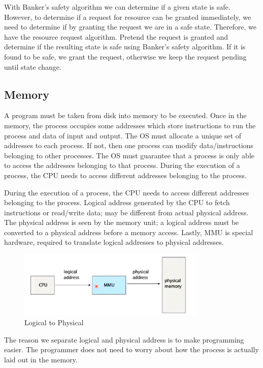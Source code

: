 \documentclass[a4paper]{article}
\theoremstyle{plain}
\theoremstyle{definition}
\newtheorem{defn}{Definition}[section]
\theoremstyle{remark}
\begin{document}
\begin{tcolorbox}[colback=black!3!white,colframe=black!60!white,title=\begin{defn}Resource Request Algorithm \label{Resource Request Algorithm}\end{defn}]
With Banker's safety algorithm we can determine if a given state is safe. However, to determine if a request for resource can be granted immediately, we need to determine if by granting the request we are in a safe state. Therefore, we have the resource request algorithm. Pretend the request is granted and determine if the resulting state is safe using Banker's safety algorithm. If it is found to be safe, we grant the request, otherwise we keep the request pending until state change.
\end{tcolorbox}
\subsection{Memory}
A program must be taken from disk into memory to be executed. Once in the memory, the process occupies some addresses which store instructions to run the process and data of input and output. The OS must allocate a unique set of addresses to each process. If not, then one process can modify data/instructions belonging to other processes. The OS must guarantee that a process is only able to access the addresses belonging to that process. During the execution of a process, the CPU needs to access different addresses belonging to the process. 
\begin{tcolorbox}[colback=black!3!white,colframe=black!60!white,title=\begin{defn}Logical vs Physical Address Space \label{Logical vs Physical Address Space}\end{defn}]
During the execution of a process, the CPU needs to access different addresses belonging to the process. Logical address generated by the CPU to fetch instructions or read/write data; may be different from actual physical address. The physical address is seen by the memory unit; a logical address must be converted to a physical address before a memory access. Lastly, MMU is special hardware, required to translate logical addresses to physical addresses.
\begin{figure}[H]
	\centering
	\includegraphics[width=0.8\textwidth]{seventyone.png}
	\caption{Logical to Physical}
	\label{fig:seventyone-png}
\end{figure}
The reason we separate logical and physical address is to make programming easier. The programmer does not need to worry about how the process is actually laid out in the memory.
\end{tcolorbox}
\end{document}
